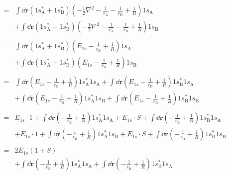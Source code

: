 \documentclass[../notes.tex]{subfiles}
\begin{document}
\begin{itemize}
\begin{align*}
        \begin{split}
            ={}& \int\dd{\mathbf{r}}(1s_\text{A}^*+1s_\text{B}^*)\left( -\frac{1}{2}\nabla^2-\frac{1}{r_\text{A}}-\frac{1}{r_\text{B}}+\frac{1}{R} \right)1s_\text{A}\\
            & +\int\dd{\mathbf{r}}(1s_\text{A}^*+1s_\text{B}^*)\left( -\frac{1}{2}\nabla^2-\frac{1}{r_\text{A}}-\frac{1}{r_\text{B}}+\frac{1}{R} \right)1s_\text{B}
        \end{split}\\
        \begin{split}
            ={}& \int\dd{\mathbf{r}}(1s_\text{A}^*+1s_\text{B}^*)\left( E_{1s}-\frac{1}{r_\text{B}}+\frac{1}{R} \right)1s_\text{A}\\
            & +\int\dd{\mathbf{r}}(1s_\text{A}^*+1s_\text{B}^*)\left( E_{1s}-\frac{1}{r_\text{A}}+\frac{1}{R} \right)1s_\text{B}
        \end{split}\\
        \begin{split}
            ={}& \int\dd{\mathbf{r}}\left( E_{1s}-\frac{1}{r_\text{B}}+\frac{1}{R} \right)1s_\text{A}^*1s_\text{A}+\int\dd{\mathbf{r}}\left( E_{1s}-\frac{1}{r_\text{B}}+\frac{1}{R} \right)1s_\text{B}^*1s_\text{A}\\
            & +\int\dd{\mathbf{r}}\left( E_{1s}-\frac{1}{r_\text{B}}+\frac{1}{R} \right)1s_\text{A}^*1s_\text{B}+\int\dd{\mathbf{r}}\left( E_{1s}-\frac{1}{r_\text{B}}+\frac{1}{R} \right)1s_\text{B}^*1s_\text{B}
        \end{split}\\
        \begin{split}
            ={}& E_{1s}\cdot 1+\int\dd{\mathbf{r}}\left( -\frac{1}{r_\text{B}}+\frac{1}{R} \right)1s_\text{A}^*1s_\text{A}+E_{1s}\cdot S+\int\dd{\mathbf{r}}\left( -\frac{1}{r_\text{B}}+\frac{1}{R} \right)1s_\text{B}^*1s_\text{A}\\
            & +E_{1s}\cdot 1+\int\dd{\mathbf{r}}\left( -\frac{1}{r_\text{B}}+\frac{1}{R} \right)1s_\text{A}^*1s_\text{B}+E_{1s}\cdot S+\int\dd{\mathbf{r}}\left( -\frac{1}{r_\text{B}}+\frac{1}{R} \right)1s_\text{B}^*1s_\text{B}
        \end{split}\\
        \begin{split}
            ={}& 2E_{1s}(1+S)\\
            & +\int\dd{\mathbf{r}}\left( -\frac{1}{r_\text{B}}+\frac{1}{R} \right)1s_\text{A}^*1s_\text{A}+\int\dd{\mathbf{r}}\left( -\frac{1}{r_\text{B}}+\frac{1}{R} \right)1s_\text{B}^*1s_\text{A}\\

\end{split}
\end{align*}
\end{itemize}
\end{document}
